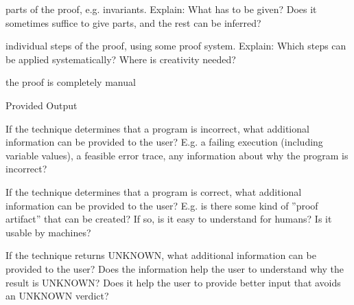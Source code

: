 \documentclass[a4paper]{article}
\begin{document}
\begin{minipage}[t]{0.16\linewidth}
\begin{betterlist}
\begin{betterlist}
			\item \checkboxUnchecked parts of the proof, e.g. invariants. Explain: What has to be given? Does it sometimes suffice to give parts, and the rest can be inferred?

			\item \checkboxUnchecked individual steps of the proof, using some proof system. Explain: Which steps can be applied systematically? Where is creativity needed?

			\item \checkboxUnchecked the proof is completely manual
		\end{betterlist}
		\item \alert{Provided Output}
		\begin{betterlist}
			\item If the technique determines that a program is incorrect, what additional information can be provided to the user? E.g. a failing execution (including variable values), a feasible error trace, any information about why the program is incorrect?

			\item If the technique determines that a program is correct, what additional information can be provided to the user? E.g. is there some kind of ”proof artifact” that can be created? If so, is it easy to understand for humans? Is it usable by machines?

			\item If the technique returns UNKNOWN, what additional information can be provided to the user? Does the information help the user to understand why the result is UNKNOWN? Does it help the user to provide better input that avoids an UNKNOWN verdict?


\end{betterlist}
\end{betterlist}
\end{minipage}
\end{document}
